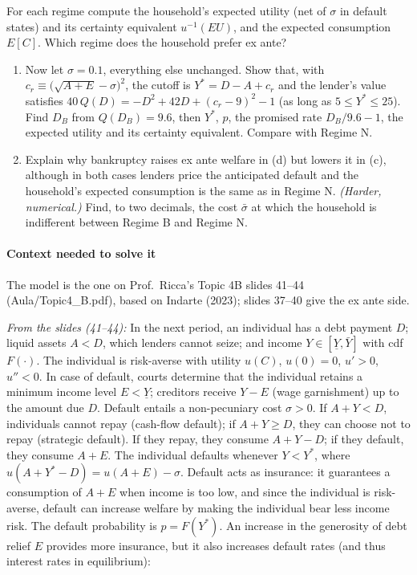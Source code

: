 \documentclass[11pt,a4paper]{article}
\begin{document}
For each regime compute the household's expected utility (net of \(\sigma\) in default states) and
its certainty equivalent \(u^{-1}(EU)\), and the expected consumption \(E[C]\). Which regime does
the household prefer ex ante?

\begin{enumerate}
\def\labelenumi{(\alph{enumi})}
\setcounter{enumi}{3}
\item
  Now let \(\sigma = 0.1\), everything else unchanged. Show that, with
  \(c_r \equiv \big(\sqrt{A + E} - \sigma\big)^2\), the cutoff is \(Y^* = D - A + c_r\) and the
  lender's value satisfies \(40\,Q(D) = -D^2 + 42D + (c_r - 9)^2 - 1\) (as long as
  \(5 \le Y^* \le 25\)). Find \(D_B\) from \(Q(D_B) = 9.6\), then \(Y^*\), \(p\), the promised rate
  \(D_B/9.6 - 1\), the expected utility and its certainty equivalent. Compare with Regime N.
\item
  Explain why bankruptcy raises ex ante welfare in (d) but lowers it in (c), although in both cases
  lenders price the anticipated default and the household's expected consumption is the same as in
  Regime N. \emph{(Harder, numerical.)} Find, to two decimals, the cost \(\bar\sigma\) at which the
  household is indifferent between Regime B and Regime N.
\end{enumerate}

\paragraph{Context needed to solve it}

The model is the one on Prof.~Ricca's Topic 4B slides 41--44 (Aula/Topic4\_B.pdf), based on Indarte
(2023); slides 37--40 give the ex ante side.

\emph{From the slides (41--44):} In the next period, an individual has a debt payment \(D\); liquid
assets \(A < D\), which lenders cannot seize; and income \(Y \in [\underline Y, \bar Y]\) with cdf
\(F(\cdot)\). The individual is risk-averse with utility \(u(C)\), \(u(0) = 0\), \(u' > 0\),
\(u'' < 0\). In case of default, courts determine that the individual retains a minimum income level
\(E < \underline Y\); creditors receive \(Y - E\) (wage garnishment) up to the amount due \(D\).
Default entails a non-pecuniary cost \(\sigma > 0\). If \(A + Y < D\), individuals cannot repay
(cash-flow default); if \(A + Y \ge D\), they can choose not to repay (strategic default). If they
repay, they consume \(A + Y - D\); if they default, they consume \(A + E\). The individual defaults
whenever \(Y < Y^*\), where \(u(A + Y^* - D) = u(A + E) - \sigma\). Default acts as insurance: it
guarantees a consumption of \(A + E\) when income is too low, and since the individual is
risk-averse, default can increase welfare by making the individual bear less income risk. The
default probability is \(p = F(Y^*)\). An increase in the generosity of debt relief \(E\) provides
more insurance, but it also increases default rates (and thus interest rates in equilibrium):
\end{document}
